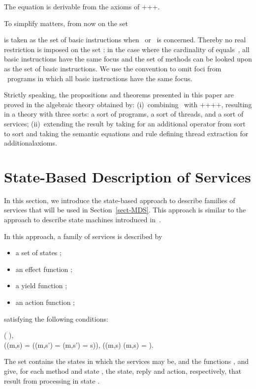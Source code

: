 \documentclass[fleqn]{llncs}
\begin{document}
The equation  is derivable from the
axioms of \BTA+\REC+\linebreak[2]\AIP+\ABSTR.

To simplify matters, from now on the set

is taken as the set  of basic instructions when \PGA\ or \PGLD\
is concerned.
Thereby no real restriction is imposed on the set : in the case
where the cardinality of  equals~, all basic instructions have
the same focus and the set  of methods can be looked upon as the
set  of basic instructions.
We use the convention to omit foci from \PGA\ programs in which all
basic instructions have the same focus.

Strictly speaking, the propositions and theorems presented in this paper
are proved in the algebraic theory obtained by:
(i)~combining \PGA\ with \BTA+\REC+\AIP+\TSI+\ABSTR, resulting in a
theory with three sorts: a sort  of programs, a sort  of
threads, and a sort  of services;
(ii)~extending the result by taking  for an additional
operator from sort  to sort  and taking the semantic
equations and rule defining thread extraction for
additional\linebreak[2] axioms.


\section{State-Based Description of Services}
\label{sect-service-descr}

In this section, we introduce the state-based approach to describe
families of services that will be used in Section~\ref{sect-MDS}.
This approach is similar to the approach to describe state machines
introduced in~\cite{BP02a}.

In this approach, a family of services is described by
\begin{itemize}
\item
a set of states ;
\item
an effect function ;
\item
a yield function
;
\item
an action function
;
\end{itemize}
satisfying the following conditions:
\pagebreak[2]
\begin{ldispl}
 {( \Implies
   )}\;,
\eqnsep
{}
 {
   {{} \\ \quad
    (\yld(m,s) = \Blocked \And
      {(\yld(m,s') = \Blocked \Implies \eff(m,s') = s)})}}\;,
\eqnsep
{}
 {(\yld(m,s) \neq \Mless \Iff \act(m,s) = \Tau)}\;.
\end{ldispl}
The set  contains the states in which the services may be, and the
functions ,  and  give, for each method  and state
, the state, reply and action, respectively, that result from
processing  in state .
\end{document}
